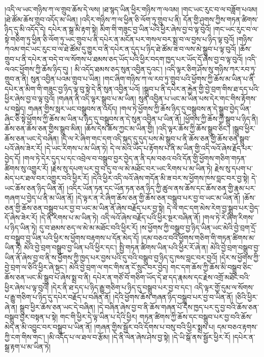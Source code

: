 །འདི་ལ་ཡང་གཉིས་ཀ་ལ་གྲུབ་ཆོས་དེ་ལས། །ཐ་སྙད་ཡིན་ཕྱིར་གཉིས་ཀ་ལའམ། །གང་ཡང་རུང་བ་ལ་བཟློག་པའམ། །ཐེ་ཚོམ་ཆོས་གྲུབ་འདོད་མ་ཡིན། །འདིར་གཉིས་ཀ་ལ་ཕྱིན་ཅི་ལོག་ཏུ་གྲུབ་པ་ནི། དོན་གྱི་ཤུགས་ཀྱིས་གཏན་ཚིགས་ཉིད་དུ་མི་འདོད་དེ། དཔེར་ན་སྒྲ་མི་རྟག་སྟེ། མིག་གི་གཟུང་བྱ་ཡིན་པའི་ཕྱིར་ཞེས་བྱ་བ་ལྟ་བུའོ། །གང་ཡང་རུང་བ་ལ་སྟེ་གཅིག་ཏུ་ཕྱིན་ཅི་ལོག་ཏུ་ཡང་གྲུབ་པ་ནི་དཔེར་ན་མངོན་པར་གསལ་བར་སྨྲ་བ་ལ་བྱས་པ་ཉིད་ལྟ་བུའོ། །གཉིས་ཀའམ་གང་ཡང་རུང་བ་ལ་ཐེ་ཚོམ་དུ་གྱུར་བ་ནི་དཔེར་ན་དུད་པ་ཉིད་ཐེ་ཚོམ་ཟ་བ་ལས་མེ་སྒྲུབ་པ་ལྟ་བུའོ། །ཆོས་གྲུབ་པ་ནི་དཔེར་ན་བདེ་བ་ལ་སོགས་པ་ཐམས་ཅད་ཡོད་པའི་ཕྱིར་བདག་ཁྱད་པར་ཡོད་དོ་ཞེས་བྱ་བ་ལྟ་བུའོ། །འདི་ལའང་ཕྱོགས་ཀྱི་ཆོས་ཉིད་དུ། །
མི་འདོད་ཐམས་ཅད་སུན་འབྱིན་དུའང་། །འདི་ལྟར་ཅིག་ཤོས་སུ་གཉིས་ཀར་རབ་ཏུ་གྲུབ་ན་ནི། སུན་འབྱིན་པའམ་གྲུབ་པ་ཡིན། །གང་ཞིག་གཉིས་ཀ་ལ་རབ་ཏུ་གྲུབ་པའི་ཕྱོགས་ཀྱི་ཆོས་མ་ཡིན་པ་ནི་དཔེར་ན་མིག་གི་གཟུང་བྱ་ཉིད་ལྟ་བུ་སྟེ་དེ་ནི་སུན་འབྱིན་པའོ། །སྒྲུབ་པ་ནི་དཔེར་ན་རྐྱེན་གྱི་བྱེ་བྲག་གིས་ཐ་དད་པའི་ཕྱིར་ཞེས་བྱ་བ་ལྟ་བུའོ། །གཞན་ནི་འདི་ལྟར་སྒྲུབ་པ་མ་ཡིན། སུན་འབྱིན་པ་ཡང་མ་ཡིན་པས་དེར་གང་གིས་རྟོགས་པ་བསྐྱེད། གཞན་གྱིས་སླར་ཡང་བསྒྲུབས་ན་འདོད། །གལ་ཏེ་ཕྱོགས་ཀྱི་ཆོས་ཉིད་དུ་བསྒྲུབས་ན་དེ་སྒྲུབ་བྱེད་ཡིན་ཞིང་ཅི་སྟེ་ཕྱོགས་ཀྱི་ཆོས་མ་ཡིན་པ་ཉིད་དུ་བསྒྲུབས་ན་དེ་སུན་འབྱིན་པ་ཡིན་ནོ། །ཕྱོགས་ཀྱི་ཆོས་ཀྱི་སྒྲུབ་པ་ཉིད་ནི། ཆོས་ཅན་ཆོས་ཅན་གྱིས་སྒྲུབ་མིན། །ཆོས་དེས་ཆོས་ཀྱང་མ་ཡིན་གྱི། །འདི་ལྟར་ཆོས་ཀྱི་ཆོས་སྒྲུབ་ཅིང་། །སྒྲུབ་ཕྱིར་ཆོས་ཅན་ཡང་དེ་བཞིན། །དེ་ལ་རེ་ཞིག་གང་དག་འདི་སྐད་དུ་དུད་པས་མེ་སྒྲུབ་པ་ནི་ཆོས་ཅན་གྱི་ཆོས་ཅན་སྒྲུབ་པའོ་ཞེས་ཟེར་རོ། །དེ་ཡང་རིགས་པ་མ་ཡིན་ཏེ། དེ་ལ་མེའི་ཡོད་པ་རྟོགས་པ་ནི་མ་ཡིན་གྱི་འདི་ལའོ་ཞེས་རྗོད་པར་བྱེད་དོ། །གལ་ཏེ་དེར་དུད་པ་དང་འབྲེལ་བ་བསྒྲུབ་བྱར་བྱེད་ན་ནི་དམ་བཅའ་བའི་དོན་གྱི་ཕྱོགས་གཅིག་གཏན་ཚིགས་སུ་འགྱུར་རོ། །རྗེས་སུ་དཔག་པར་བྱ་བ་དུ་བ་ལ་མེ་མཐོང་བར་ཡང་རིགས་པ་མ་ཡིན་ཏེ། རྗེས་སུ་དཔག་པ་མེད་པར་ཐལ་བར་འགྱུར་བའི་ཕྱིར་རོ། །དེའི་ཕྱིར་འདི་ལའོ་ཞེས་གདོན་མི་ཟ་བར་ས་ཕྱོགས་ཁས་བླང་བར་བྱ་སྟེ། དེ་ཡང་ཆོས་ཅན་ཉིད་ཡིན་ནོ། །འདིར་ཡོན་ཏན་དང་ཡོན་ཏན་ཅན་ཉིད་ཀྱི་ཚུལ་ནས་ཆོས་དང་ཆོས་ཅན་གྱི་རྣམ་པར་གཞག་པ་བྱེད་པ་ནི་མ་ཡིན་ནོ། །དེ་ལྟར་ན་རེ་ཞིག་ཆོས་ཅན་གྱི་ཆོས་ཅན་བསྒྲུབ་པར་བྱ་བ་ཡང་མ་ཡིན་ནོ། །ཆོས་ཅན་གྱི་ཆོས་ཅན་བསྒྲུབ་པར་བྱ་བ་ཡང་མ་ཡིན་ནོ་ཞེས་བརྗོད་པར་བྱ་སྟེ། དེ་ལ་གང་དག་མེས་རེག་བྱ་སྒྲུབ་པར་བྱེད་དོ་ཞེས་ཟེར་རོ། །དེ་ནི་རིགས་པ་མ་ཡིན་ཏེ། འདི་ལའོ་ཞེས་བརྗོད་པའི་ཕྱིར་སྔར་བཞིན་ནོ། །གལ་ཏེ་རེ་ཞིག་རིགས་པ་ཉིད་ཡིན་ཏེ། དུ་བ་ཐམས་ཅད་ལ་མེ་མ་མཐོང་བའི་ཕྱིར་རོ། །ས་ཕྱོགས་ཀྱི་བསྒྲུབ་བྱ་ཉིད་ཡིན་ཡང་མེའི་བྱེ་བྲག་དྲོ་བ་བསྒྲུབ་བྱ་ཡིན་པའི་ཕྱིར་ས་ཕྱོགས་བརྟགས་པ་དོན་མེད་དོ། །དམ་བཅའ་བའི་ཕྱོགས་གཅིག་གི་གཏན་ཚིགས་མ་ཡིན་ཏེ། མེའི་བྱེ་བྲག་བསྒྲུབ་བྱ་ཡིན་པའི་ཕྱིར་དང་། སྤྱི་གཏན་ཚིགས་ཡིན་པའི་ཕྱིར་རོ་ཞེ་ན། མེའི་བྱེ་བྲག་བསྒྲུབ་བྱ་ཡིན་ནོ་ཞེས་བྱ་བ་ནི་ས་ཕྱོགས་ཀྱི་ཁྱད་པར་བྱས་པའི་དུ་བའི་བསྒྲུབ་བྱ་ཉིད་དུ་ཁས་བླང་བར་བྱའོ། །དེར་ས་ཕྱོགས་ཀྱི་བྱེ་བྲག་ལ་ཅིའི་ཕྱིར་ཞེ་སྡང་། མེའི་བྱེ་བྲག་ལ་གང་གིས་ན་ངོ་སྲུང་བར་བྱེད། གང་དག་ཆོས་ཀྱི་ཆོས་མི་བསྒྲུབ་ཅིང་ཆོས་ཅན་ཡང་མི་སྒྲུབ་པོ་ཞེས་སྨྲ་བ་ནི། དཔེར་ན་གཙོ་བོ་གཅིག་ཡོད་དེ་ཐ་དད་རྣམས་དང་རྗེས་འགྲོ་མཐོང་བའི་ཕྱིར་ཞེས་པ་ལྟ་བུའོ། །དེར་ནི་ཐ་དད་པ་ཉིད་རྒྱུ་གཅིག་པ་ཉིད་དུ་བསྒྲུབ་པར་བྱ་བ་དང་། འདི་ལྟར་གྱོ་དུམ་ལ་སོགས་པ་རྒྱུ་གཅིག་པ་ཉིད་དུ་དཔེར་བརྗོད་པ་བཞིན་ནོ། །དེའི་ཕྱོགས་ཆོས་གཞན་ཉིད་བསྒྲུབ་པར་བྱ་བ་ཡིན་ནོ། །ཅིའི་ཕྱིར་ཞེ་ན། སྒྲུབ་ཕྱིར་ཆོས་ཅན་ཡང་དེ་བཞིན། །དེ་བཞིན་ཞེས་བྱ་བ་ནི་ཆོས་གཞན་པོ་དེས་ཁྱད་པར་དུ་བྱ་བའི་ཆོས་ཅན་བསྒྲུབ་བྱར་བསྟན་པ་སྟེ། གང་གི་ཕྱིར་དེ་ལྟ་ཡིན་པ་དེའི་ཕྱིར། གཏན་ཚིགས་ཀྱི་ཆོས་དང་བསྒྲུབ་པར་བྱ་བའི་ཆོས་མེད་ན་མི་འབྱུང་བར་བསྒྲུབ་པ་ཡིན་ནོ། །གཞན་གྱིས་སྦྱོར་བའི་དོགས་པ་བསུ་བའི་ཕྱིར་སྨྲས་པ། དམ་བཅའ་རྟགས་ཀྱི་ངག་གིས་གང་། །མི་འདོད་པ་ལ་ཐལ་བ་རྩོམ། །དེ་ནི་ལེན་ཞེས་ཤེས་བྱ་སྟེ། །དེ་ཡི་སྒོ་ནས་སྦྱོར་ཕྱིར་རོ། །དཔེར་ན་སྒྲ་རྟག་པ་མ་ཡིན་ཏེ། 